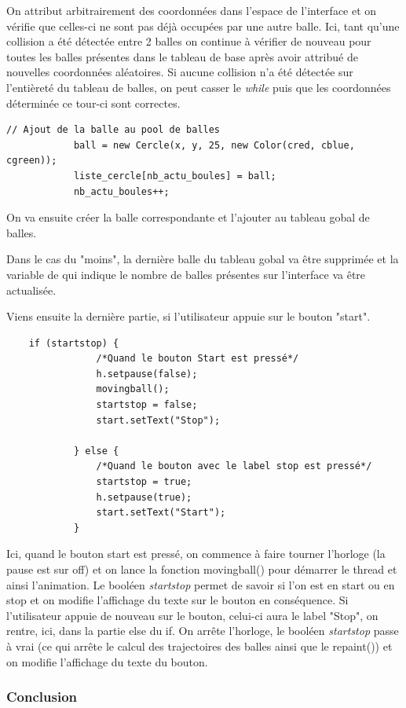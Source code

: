 \documentclass{article}
\begin{document}
\begin{enumerate}
On attribut arbitrairement des coordonnées dans l'espace de l'interface et on vérifie que celles-ci ne sont pas déjà occupées par une autre balle. Ici, tant qu'une collision a été détectée entre 2 balles on continue à vérifier de nouveau pour toutes les balles présentes dans le tableau de base après avoir attribué de nouvelles coordonnées aléatoires. 
Si aucune collision n'a été détectée sur l'entièreté du tableau de balles, on peut casser le \textit{while} puis que les coordonnées déterminée ce tour-ci sont correctes.

\begin{verbatim}
// Ajout de la balle au pool de balles
			ball = new Cercle(x, y, 25, new Color(cred, cblue, cgreen));
			liste_cercle[nb_actu_boules] = ball;
			nb_actu_boules++;
\end{verbatim}

On va ensuite créer la balle correspondante et l'ajouter au tableau gobal de balles.

Dans le cas du "moins", la dernière balle du tableau gobal va être supprimée et la variable de qui indique le nombre de balles présentes sur l'interface va être actualisée.

Viens ensuite la dernière partie, si l'utilisateur appuie sur le bouton "start".

\begin{verbatim}
	if (startstop) {
				/*Quand le bouton Start est pressé*/
				h.setpause(false);
				movingball();
				startstop = false;
				start.setText("Stop");
				
			} else {
				/*Quand le bouton avec le label stop est pressé*/
				startstop = true;
				h.setpause(true);
				start.setText("Start");
			}
\end{verbatim}

Ici, quand le bouton start est pressé, on commence à faire tourner l'horloge (la pause est sur off) et on lance la fonction movingball() pour démarrer le thread et ainsi l'animation. Le booléen \textit{startstop} permet de savoir si l'on est en start ou en stop et on modifie l'affichage du texte sur le bouton en conséquence.
Si l'utilisateur appuie de nouveau sur le bouton, celui-ci aura le label "Stop", on rentre, ici, dans la partie else du if. On arrête l'horloge, le booléen \textit{startstop} passe à vrai (ce qui arrête le calcul des trajectoires des balles ainsi que le repaint()) et on modifie l'affichage du texte du bouton. 

\subsubsection{Conclusion}


\end{enumerate}
\end{document}
